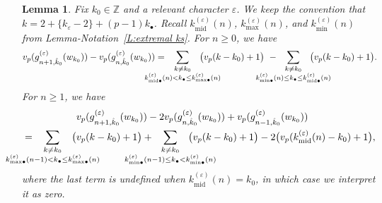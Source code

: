 \documentclass[12pt]{amsart}
\newtheorem{lemma}[subsection]{Lemma}
\theoremstyle{definition}
\numberwithin{equation}{subsection}
\def\ZZ{\mathbb{Z}}
\newcommand{\midd}{\mathrm{mid}}
\begin{document}
\begin{lemma}
\label{L:increment of ghost valuation}
Fix $k_0 \in \ZZ$ and a relevant character $\varepsilon$. 
We keep the convention that $k = 2+\{k_\varepsilon-2\} + (p-1)k_\bullet$. Recall $k_\midd^{(\varepsilon)}(n)$, $k_{\max}^{(\varepsilon)}(n)$, and  $k_{\min}^{(\varepsilon)}(n)$ from Lemma-Notation~\ref{L:extremal ks}.
For $n \geq 0$, we have
\begin{equation}
\label{E:increment of ghost series valuation 1}
v_p(g_{n+1, \hat k_0}^{(\varepsilon)}(w_{k_0})) - v_p(g_{n, \hat k_0}^{(\varepsilon)}(w_{k_0})) =  \hspace{-25pt}
\sum_{\substack{
k \neq k_0
\\
k^{(\varepsilon)}_{\midd\bullet}(n) < k_\bullet \leq k^{(\varepsilon)}_{{\max}\bullet}(n)}}
\hspace{-25pt}\big( v_p(k-k_0)+1 \big)\ -  \hspace{-25pt} \sum_{\substack{
k \neq k_0\\
k^{(\varepsilon)}_{{\min}\bullet}(n) \leq k_\bullet \leq k^{(\varepsilon)}_{{\midd}\bullet}(n)}}
\hspace{-25pt}\big( v_p(k-k_0)+1 \big).
\end{equation}
For $n \geq 1$, we have 
\begin{align}
\label{E:increment of ghost series valuation 2}
& v_p(g_{n+1, \hat k_0}^{(\varepsilon)}(w_{k_0})) -2v_p(g_{n, \hat k_0}^{(\varepsilon)}(w_{k_0}))  + v_p(g_{n-1, \hat k_0}^{(\varepsilon)}(w_{k_0})) 
\\
\nonumber
=\hspace{-30pt}
\sum_{\substack{
k \neq k_0\\
k^{(\varepsilon)}_{{\max}\bullet}(n-1) < k_\bullet \leq k^{(\varepsilon)}_{{\max}\bullet}(n)}} 
\hspace{-30pt}\big(& v_p(k-k_0)+1 \big)
+\hspace{-30pt}
\sum_{\substack{
k \neq k_0\\
k^{(\varepsilon)}_{{\min}\bullet}(n-1) \leq k_\bullet < k^{(\varepsilon)}_{{\min}\bullet}(n)}}
\hspace{-30pt}\big( v_p(k-k_0)+1 \big)
- 
2 \big( v_p(k_\midd^{(\varepsilon)}(n) - k_0) + 1\big),
\end{align}
where the last term is undefined when $k_{\midd}^{(\varepsilon)}(n)= k_0$, in which case we interpret it as zero.
\end{lemma}
\end{document}

